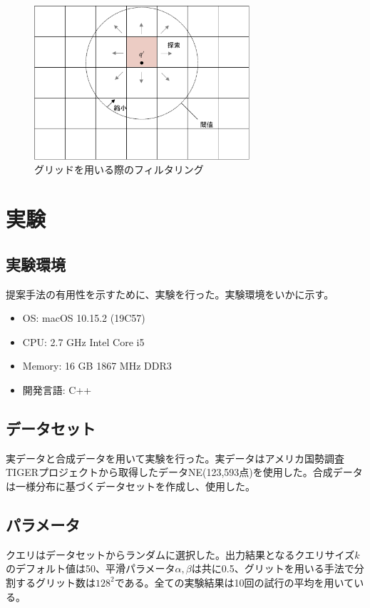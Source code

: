 \documentclass{deimj}
\theoremstyle{definition}
\begin{document}
\begin{figure}[H]
	\centering
    \includegraphics[width=8cm]{images/sol-grid-filter.pdf}
    \caption{グリッドを用いる際のフィルタリング}
    \label{fig:sol-grid-filter}
\end{figure}

\section{実験}
\subsection{実験環境}
提案手法の有用性を示すために、実験を行った。実験環境をいかに示す。
\begin{itemize}
  \item OS: macOS 10.15.2 (19C57)
  \item CPU: 2.7 GHz Intel Core i5
  \item Memory: 16 GB 1867 MHz DDR3
  \item 開発言語: C++
\end{itemize}

\subsection{データセット}
実データと合成データを用いて実験を行った。実データはアメリカ国勢調査TIGERプロジェクト\cite{chorochronos}から取得したデータNE(123,593点)を使用した。合成データは一様分布に基づくデータセットを作成し、使用した。

\subsection{パラメータ}
クエリはデータセットからランダムに選択した。出力結果となるクエリサイズ$k$のデフォルト値は50、平滑パラメータ$\alpha, \beta$は共に0.5、グリットを用いる手法で分割するグリット数は$128^2$である。全ての実験結果は10回の試行の平均を用いている。
\end{document}

